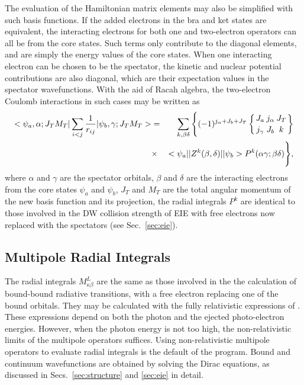 The evaluation of the Hamiltonian matrix elements may also be simplified with
such basis functions. If the added electrons in the bra and ket states are
equivalent, the 
interacting electrons for both one and two-electron operators can all be from
the core states. Such terms only contribute to the diagonal elements, and are
simply the energy values of the core states. When one interacting electron can
be chosen to be the spectator, the kinetic and nuclear potential contributions
are also diagonal, which are their expectation values in the spectator
wavefunctions. With the aid of Racah algebra, the two-electron Coulomb
interactions in such cases may be written as \cite{barshalom:1988a} 
\begin{eqnarray}
<\psi_a,\alpha;J_TM_T|\sum_{i<j}\frac{1}{r_{ij}}|\psi_b,\gamma;J_TM_T>&=&
\sum_{k,\beta\delta}\Bigg\{(-1)^{j_\alpha+J_b+J_T}
\sixj{J_a}{j_\alpha}{J_T}{j_\gamma}{J_b}{k}
\nonumber\\*
&\times&
<\psi_a||Z^k(\beta,\delta)||\psi_b>P^k(\alpha\gamma;\beta\delta)\Bigg\},
\end{eqnarray}
where $\alpha$ and $\gamma$ are the spectator orbitals, $\beta$ and $\delta$
are the interacting electrons from the core states $\psi_a$ and $\psi_b$, $J_T$
and $M_T$ are the total angular momentum of the new basis function and its
projection, 
the radial integrals $P^k$ are identical to those involved in the DW collision
strength of EIE with free electrons now replaced with the spectators
(see Sec.~\ref{sec:eie}).

\subsection{Multipole Radial Integrals}
The radial integrals $M^L_{\kappa\beta}$ are the same as those involved in the
the calculation of bound-bound radiative transitions, with a free electron
replacing one of the bound orbitals. They may be calculated with the fully
relativistic expressions of \citet{grant74}. These expressions depend on
both the photon and the ejected photo-electron energies. However, when the
photon energy is not too high, the non-relativistic limits of the multipole
operators suffices. Using non-relativistic multipole operators to
evaluate radial integrals is the default of the program. 
Bound and continuum wavefunctions are obtained by solving the Dirac equations,
as discussed in Secs.~\ref{sec:structure} and \ref{sec:eie} in detail.

